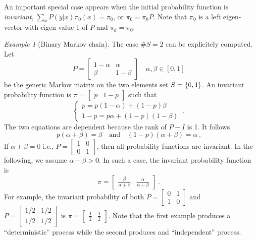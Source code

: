 \documentclass[12pt,a4paper]{amsart}
\theoremstyle{plain}%
\theoremstyle{definition}
\theoremstyle{remark}
\newtheorem{example}{Example}
\begin{document}
An important special case appears when the initial probability function is \emph{invariant}, $\sum_{x} P(y|x) \pi_0(x) = \pi_0$, or $\pi_0 = \pi_0 P$. Note that $\pi_0$ is a left eigen-vector with eigen-value 1 of $P$ and $\pi_k = \pi_0$.

\begin{example}[Binary Markov chain] The case $\# S = 2$ can be
  explicitely computed. Let
\begin{equation*}
  P = \begin{bmatrix} 1-\alpha & \alpha \\ \beta & 1-\beta
  \end{bmatrix}  \quad \alpha,\beta \in [0,1]
\end{equation*}
be the generic Markov matrix on the two elements set $S=\left\{0,1\right\}$. An invariant probability function is $\pi =
\begin{bmatrix}
  p & 1-p
\end{bmatrix}$
such that
\begin{equation*}
  \begin{cases}
    p = p(1-\alpha) + (1-p)\beta \\ 1-p = p\alpha + (1-p)(1-\beta)
  \end{cases} \ .
\end{equation*}
The two equations are dependent because the rank of $P-I$ is 1. It follows
\begin{equation*}
  p(\alpha+\beta) = \beta \quad \text{and} \quad (1-p)(\alpha+\beta) = \alpha \ .
\end{equation*}
If $\alpha+\beta=0$ i.e., $P=
\begin{bmatrix}
  1 & 0 \\ 0 & 1
\end{bmatrix}$, then all probability functions are invariant. In the following, we assume $\alpha+\beta > 0$. In such a case, the invariant probability function is
\begin{equation*}
  \pi =
  \begin{bmatrix}
    \frac \beta {\alpha+\beta} & \frac \alpha {\alpha+\beta}
  \end{bmatrix} \ .
\end{equation*}
For example, the invariant probability of both $P =
\begin{bmatrix}
  0 & 1 \\ 1 & 0
\end{bmatrix}$ and $P =
\begin{bmatrix}
  1/2 & 1/2 \\ 1/2 & 1/2
\end{bmatrix}$
is $\pi =
\begin{bmatrix}
  \frac12 & \frac12
\end{bmatrix}$.
Note that the first example produces a ``deterministic'' process while the second produces and ``independent'' process.


\end{example}
\end{document}
